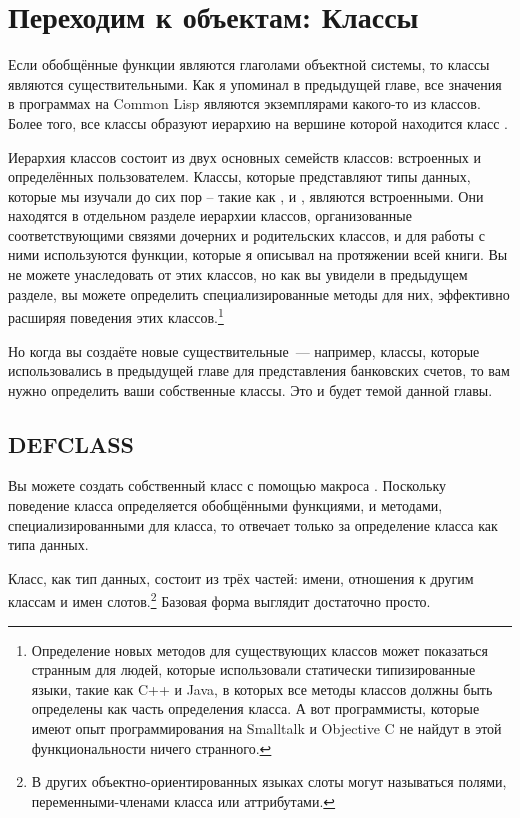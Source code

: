 \chapter{Переходим к объектам: Классы}
\label{ch:17}

Если обобщённые функции являются глаголами объектной системы, то классы являются
существительными.  Как я упоминал в предыдущей главе, все значения в программах на Common
Lisp являются экземплярами какого-то из классов.  Более того, все классы образуют иерархию
на вершине которой находится класс .

Иерархия классов состоит из двух основных семейств классов: встроенных и определённых
пользователем.  Классы, которые представляют типы данных, которые мы изучали до сих пор --
такие как ,  и , являются встроенными.  Они
находятся в отдельном разделе иерархии классов, организованные соответствующими связями
дочерних и родительских классов, и для работы с ними используются функции, которые я
описывал на протяжении всей книги.  Вы не можете унаследовать от этих классов, но как вы
увидели в предыдущем разделе, вы можете определить специализированные методы для них,
эффективно расширяя поведения этих классов.\footnote{Определение новых методов для
  существующих классов может показаться странным для людей, которые использовали
  статически типизированные языки, такие как C++ и Java, в которых все методы классов
  должны быть определены как часть определения класса.  А вот программисты, которые имеют
  опыт программирования на Smalltalk и Objective C не найдут в этой функциональности
  ничего странного.}

Но когда вы создаёте новые существительные~--- например, классы, которые использовались в
предыдущей главе для представления банковских счетов, то вам нужно определить ваши
собственные классы.  Это и будет темой данной главы.

\section{DEFCLASS}

Вы можете создать собственный класс с помощью макроса .  Поскольку
поведение класса определяется обобщёнными функциями, и методами, специализированными для
класса, то  отвечает только за определение класса как типа данных.

Класс, как тип данных, состоит из трёх частей: имени, отношения к другим классам и имен
слотов.\footnote{В других объектно-ориентированных языках слоты могут называться полями,
переменными-членами класса или аттрибутами.}  Базовая форма  выглядит
достаточно просто.


